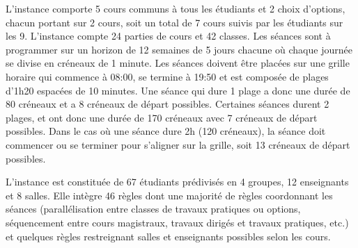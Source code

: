 L'instance comporte 5 cours communs à tous les étudiants et 2 choix d'options, chacun portant sur 2 cours, soit un total de 7 cours suivis par les étudiants sur les 9.
L'instance compte 24 parties de cours et 42 classes.
Les séances sont à programmer sur un horizon de 12 semaines de 5 jours chacune %
où chaque journée se divise en créneaux de 1 minute.
Les séances doivent être placées sur une grille horaire qui commence à 08\string:00, se termine à 19\string:50 et est composée de plages d'1h20 espacées de 10 minutes.
Une séance qui dure 1 plage a donc une durée de 80 créneaux et a 8 créneaux de départ possibles.
Certaines séances durent 2 plages, et ont donc une durée de 170 créneaux avec 7 créneaux de départ possibles.
Dans le cas où une séance dure 2h (120 créneaux), la séance doit commencer ou se terminer pour s'aligner sur la grille, soit 13 créneaux de départ possibles.


L'instance est constituée de 67 étudiants prédivisés en 4 groupes, 12 enseignants et 8 salles.
Elle intègre 46 règles dont une majorité de règles coordonnant les séances (parallélisation entre classes de travaux pratiques ou options, séquencement entre cours magistraux, travaux dirigés et travaux pratiques, etc.) et quelques règles restreignant salles et enseignants possibles selon les cours.

